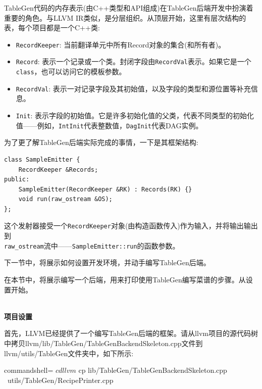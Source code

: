 TableGen代码的内存表示(由C++类型和API组成)在TableGen后端开发中扮演着重要的角色。与LLVM IR类似，是分层组织。从顶层开始，这里有层次结构的表，每个项目都是一个C++类:

\begin{itemize}
\item \texttt{RecordKeeper}: 当前翻译单元中所有Record对象的集合(和所有者)。
\item \texttt{Record}: 表示一个记录或一个类。封闭字段由\texttt{RecordVal}表示。如果它是一个\texttt{class}，也可以访问它的模板参数。
\item \texttt{RecordVal}: 表示一对记录字段及其初始值，以及字段的类型和源位置等补充信息。
\item \texttt{Init}: 表示字段的初始值。它是许多初始化值的父类，代表不同类型的初始化值——例如，\texttt{IntInit}代表整数值，\texttt{DagInit}代表DAG实例。
\end{itemize}

为了更了解TableGen后端实际完成的事情，一下是其框架结构:

\begin{lstlisting}[style=styleCXX]
class SampleEmitter {
	RecordKeeper &Records;
public:
	SampleEmitter(RecordKeeper &RK) : Records(RK) {}
	void run(raw_ostream &OS);
};
\end{lstlisting}

这个发射器接受一个\texttt{RecordKeeper}对象(由构造函数传入)作为输入，并将输出输出到\\\texttt{raw\_ostream}流中——\texttt{SampleEmitter::run}的函数参数。

下一节中，将展示如何设置开发环境，并动手编写TableGen后端。


在本节中，将展示编写一个后端，用来打印使用TableGen编写菜谱的步骤。从设置开始。

\hspace*{\fill} \\ %
\noindent
\textbf{项目设置}

首先，LLVM已经提供了一个编写TableGen后端的框架。请从llvm项目的源代码树中拷贝llvm/lib/TableGen/TableGenBackendSkeleton.cpp文件到llvm/utils/TableGen文件夹中，如下所示:

\begin{tcblisting}{commandshell={}}
$ cd llvm
$ cp lib/TableGen/TableGenBackendSkeleton.cpp \
      utils/TableGen/RecipePrinter.cpp
\end{tcblisting}

